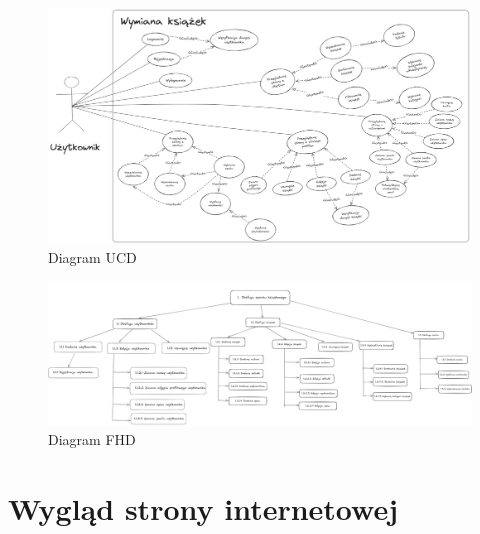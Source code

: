 \documentclass[12pt]{article}
\begin{document}
\begin{figure}[h!]
	\centering
	\includegraphics[width=18cm]{figures/diagramUCD.png}
	\caption{Diagram UCD}
\end{figure}

\begin{figure}[h!]
	\centering
	\includegraphics[width=18cm]{figures/diagramFHD.png}
	\caption{Diagram FHD}
\end{figure}

\clearpage
\section{Wygląd strony internetowej}
\end{document}

